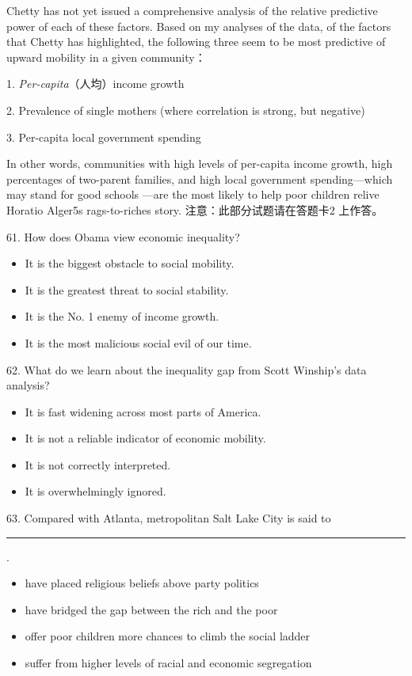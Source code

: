 \documentclass[UTF8,11pt]{ctexart}
\begin{document}
Chetty has not yet issued a comprehensive analysis of the relative predictive power of each of these factors. Based on my analyses of the data, of the factors that Chetty has highlighted, the following three seem to be most predictive of upward mobility in a given community：


1.\textit{ Per-capita}（人均）income growth


2. Prevalence of single mothers (where correlation is strong, but negative)


3. Per-capita local government spending


In other words, communities with high levels of per-capita income growth, high percentages of two-parent families, and high local government spending—which may stand for good schools —are the most likely to help poor children relive Horatio Alger5s rags-to-riches story. 注意：此部分试题请在答题卡2 上作答。


61. How does Obama view economic inequality?


\begin{itemize}[leftmargin=2em,itemsep=.2em,topsep=.4em]\item[A.] It is the biggest obstacle to social mobility.
\item[B.] It is the greatest threat to social stability.
\item[C.] It is the No. 1 enemy of income growth.
\item[D.] It is the most malicious social evil of our time.
\end{itemize}

62. What do we learn about the inequality gap from Scott Winship’s data analysis?


\begin{itemize}[leftmargin=2em,itemsep=.2em,topsep=.4em]\item[A.] It is fast widening across most parts of America.
\item[B.] It is not a reliable indicator of economic mobility.
\item[C.] It is not correctly interpreted.
\item[D.] It is overwhelmingly ignored.
\end{itemize}

63. Compared with Atlanta, metropolitan Salt Lake City is said to\par\noindent\rule{.95\linewidth}{.4pt}\par .


\begin{itemize}[leftmargin=2em,itemsep=.2em,topsep=.4em]\item[A.] have placed religious beliefs above party politics
\item[B.] have bridged the gap between the rich and the poor
\item[C.] offer poor children more chances to climb the social ladder
\item[D.] suffer from higher levels of racial and economic segregation
\end{itemize}
\end{document}

